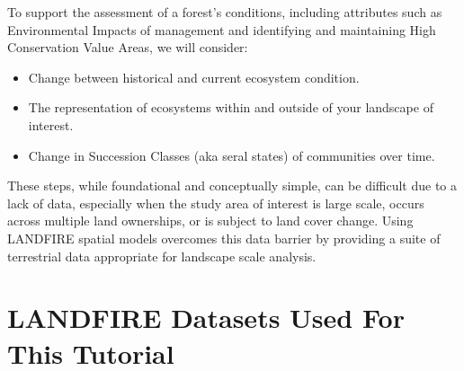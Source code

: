 \documentclass[
]{book}
\providecommand{\tightlist}{%
  \setlength{\itemsep}{0pt}\setlength{\parskip}{0pt}}
\begin{document}
To support the assessment of a forest's conditions, including attributes such as Environmental Impacts of management and identifying and maintaining High Conservation Value Areas, we will consider:

\begin{itemize}
\tightlist
\item
  Change between historical and current ecosystem condition.
\item
  The representation of ecosystems within and outside of your landscape of interest.
\item
  Change in Succession Classes (aka seral states) of communities over time.
\end{itemize}

These steps, while foundational and conceptually simple, can be difficult due to a lack of data, especially when the study area of interest is large scale, occurs across multiple land ownerships, or is subject to land cover change. Using LANDFIRE spatial models overcomes this data barrier by providing a suite of terrestrial data appropriate for landscape scale analysis.

\hypertarget{landfire-datasets-used-for-this-tutorial}{%
\section{LANDFIRE Datasets Used For This Tutorial}\label{landfire-datasets-used-for-this-tutorial}}
\end{document}
